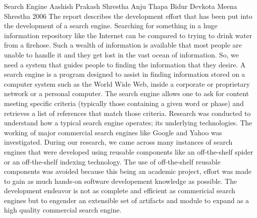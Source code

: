  \begin{conf-abstract}[]
{Search Engine}
{
Aashish Prakash Shrestha
Anju Thapa
Bidur Devkota
Meena Shrestha
}
{2006}
The report describes the development effort that has been put into the development of a search engine. Searching for something in a huge information repository like the Internet can be compared to trying to drink water from a firehose. Such a wealth of information is available that most people are unable to handle it and they get lost in the vast ocean of information. So, we need a system that guides people to finding the information that they desire. A search engine is a program designed to assist in finding information stored on a computer system such as the World Wide Web, inside a corporate or proprietary network or a personal computer. The search engine allows one to ask for content meeting specific criteria (typically those containing a given word or phase) and retrieves a list of references that match those criteria. Research was conducted to understand how a typical search engine operates; its underlying technologies. The working of major commercial search engines like Google and Yahoo was investigated. During our research, we came across many instances of search engines that were developed using reusable components like an off-the-shelf spider or an off-the-shelf indexing technology. The use of off-the-shelf reusable components was avoided because this being an academic project, effort was made to gain as much hands-on software developement knowledge as possible. The development endeavor is not as complete and efficient as commericial search engines but to engender an extensible set of artifacts and module to expand as a high quality commercial search engine.
  \end{conf-abstract}